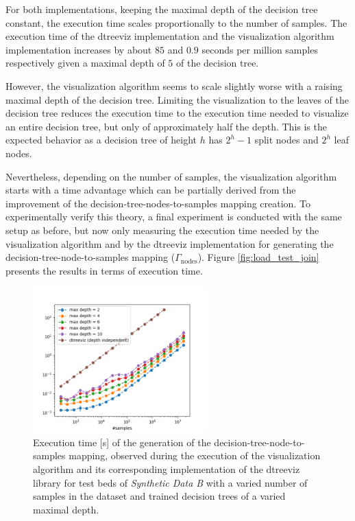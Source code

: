 For both implementations, keeping the maximal depth of the decision tree constant, the execution time scales proportionally to the number of samples. The execution time of the dtreeviz implementation and the visualization algorithm implementation increases by about $85$ and $0.9$ seconds per million samples respectively given a maximal depth of $5$ of the decision tree.

However, the visualization algorithm seems to scale slightly worse with a raising maximal depth of the decision tree. Limiting the visualization to the leaves of the decision tree reduces the execution time to the execution time needed to visualize an entire decision tree, but only of approximately half the depth. This is the expected behavior as a decision tree of height $h$ has $2^h - 1$ split nodes and $2^h$ leaf nodes. 

Nevertheless, depending on the number of samples, the visualization algorithm starts with a time advantage which can be partially derived from the improvement of the decision-tree-nodes-to-samples mapping creation. To experimentally verify this theory, a final experiment is conducted with the same setup as before, but now only measuring the execution time needed by the visualization algorithm and by the dtreeviz implementation for generating the decision-tree-node-to-samples mapping ($\Gamma_\text{nodes}$). Figure \ref{fig:load_test_join} presents the results in terms of execution time. 

\begin{figure}
    \centering
    \includegraphics[width=0.6\textwidth]{images/evaluation/node_samples_exp.png}
    \caption{Execution time [s] of the generation of the decision-tree-node-to-samples mapping, observed during the execution of the visualization algorithm and its corresponding implementation of the dtreeviz library for test beds of \textit{Synthetic Data B} with a varied number of samples in the dataset and trained decision trees of a varied maximal depth.}
    \label{fig:node_samples_eval}
\end{figure}

